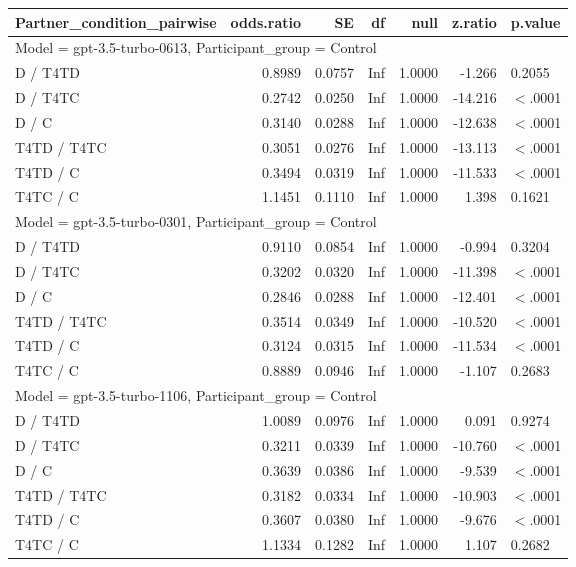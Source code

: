 \begin{table}[ht]
\centering
\begin{tabular}{lrrrrrl}
  \hline
Partner\_condition\_pairwise & odds.ratio & SE & df & null & z.ratio & p.value \\ 
  \hline
\multicolumn{7}{l}{Model = gpt-3.5-turbo-0613, Participant_group = Control}\\
D / T4TD & 0.8989 & 0.0757 & Inf & 1.0000 & -1.266 & 0.2055 \\ 
  D / T4TC & 0.2742 & 0.0250 & Inf & 1.0000 & -14.216 & $<$.0001 \\ 
  D / C & 0.3140 & 0.0288 & Inf & 1.0000 & -12.638 & $<$.0001 \\ 
  T4TD / T4TC & 0.3051 & 0.0276 & Inf & 1.0000 & -13.113 & $<$.0001 \\ 
  T4TD / C & 0.3494 & 0.0319 & Inf & 1.0000 & -11.533 & $<$.0001 \\ 
  T4TC / C & 1.1451 & 0.1110 & Inf & 1.0000 & 1.398 & 0.1621 \\ 
   \hline
\multicolumn{7}{l}{Model = gpt-3.5-turbo-0301, Participant_group = Control}\\
D / T4TD & 0.9110 & 0.0854 & Inf & 1.0000 & -0.994 & 0.3204 \\ 
  D / T4TC & 0.3202 & 0.0320 & Inf & 1.0000 & -11.398 & $<$.0001 \\ 
  D / C & 0.2846 & 0.0288 & Inf & 1.0000 & -12.401 & $<$.0001 \\ 
  T4TD / T4TC & 0.3514 & 0.0349 & Inf & 1.0000 & -10.520 & $<$.0001 \\ 
  T4TD / C & 0.3124 & 0.0315 & Inf & 1.0000 & -11.534 & $<$.0001 \\ 
  T4TC / C & 0.8889 & 0.0946 & Inf & 1.0000 & -1.107 & 0.2683 \\ 
   \hline
\multicolumn{7}{l}{Model = gpt-3.5-turbo-1106, Participant_group = Control}\\
D / T4TD & 1.0089 & 0.0976 & Inf & 1.0000 & 0.091 & 0.9274 \\ 
  D / T4TC & 0.3211 & 0.0339 & Inf & 1.0000 & -10.760 & $<$.0001 \\ 
  D / C & 0.3639 & 0.0386 & Inf & 1.0000 & -9.539 & $<$.0001 \\ 
  T4TD / T4TC & 0.3182 & 0.0334 & Inf & 1.0000 & -10.903 & $<$.0001 \\ 
  T4TD / C & 0.3607 & 0.0380 & Inf & 1.0000 & -9.676 & $<$.0001 \\ 
  T4TC / C & 1.1334 & 0.1282 & Inf & 1.0000 & 1.107 & 0.2682 \\ 

\end{tabular}
\end{table}
